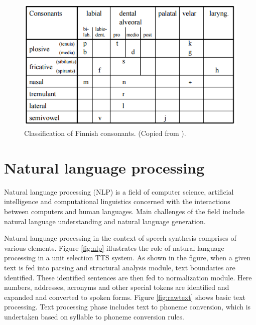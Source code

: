 \documentclass[11pt,a4paper,oneside,article]{memoir}
\begin{document}
\begin{figure}[h]
  \includegraphics[width=14cm]{consonants}
  \caption{Classification of Finnish consonants. (Copied from \cite{hut}).}
  \label{fig:consonants}
\end{figure}


\section{Natural language processing}

Natural language processing (NLP) is a field of computer science, artificial intelligence and computational linguistics concerned with the interactions between computers and human languages. Main challenges of the field include natural language understanding and natural language generation.

Natural language processing in the context of speech synthesis comprises of various elements. Figure \vref{fig:nlp} illustrates the role of natural language processing in a unit selection TTS system. As shown in the figure, when a given text is fed into parsing and structural analysis module, text boundaries are identified. These identified sentences are then fed to normalization module. Here numbers, addresses, acronyms and other special tokens are identified and expanded and converted to spoken forms.  Figure \vref{fig:rawtext} shows basic text processing. Text processing phase includes text to phoneme conversion, which is undertaken based on syllable to phoneme conversion rules.
\end{document}
